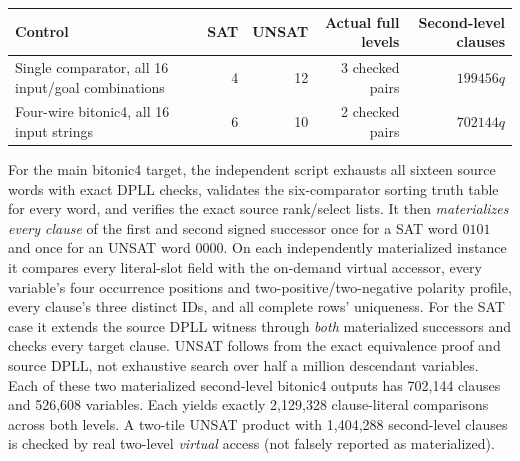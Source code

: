 \documentclass[11pt]{article}
\begin{document}
\begin{center}\small
\begin{tabular}{@{}lrrrr@{}}\toprule
Control & SAT & UNSAT & Actual full levels & Second-level clauses\\\midrule
Single comparator, all 16 input/goal combinations &4&12&3 checked pairs&$199456q$\\
Four-wire bitonic4, all 16 input strings &6&10&2 checked pairs&$702144q$\\\bottomrule
\end{tabular}
\end{center}

For the main bitonic4 target, the independent script exhausts all sixteen source words with exact DPLL checks, validates the six-comparator sorting truth table for every word, and verifies the exact source rank/select lists. It then \emph{materializes every clause} of the first and second signed successor once for a SAT word $0101$ and once for an UNSAT word $0000$. On each independently materialized instance it compares every literal-slot field with the on-demand virtual accessor, every variable's four occurrence positions and two-positive/two-negative polarity profile, every clause's three distinct IDs, and all complete rows' uniqueness. For the SAT case it extends the source DPLL witness through \emph{both} materialized successors and checks every target clause. UNSAT follows from the exact equivalence proof and source DPLL, not exhaustive search over half a million descendant variables. Each of these two materialized second-level bitonic4 outputs has 702,144 clauses and 526,608 variables. Each yields exactly 2,129,328 clause-literal comparisons across both levels. A two-tile UNSAT product with 1,404,288 second-level clauses is checked by real two-level \emph{virtual} access (not falsely reported as materialized).
\end{document}
